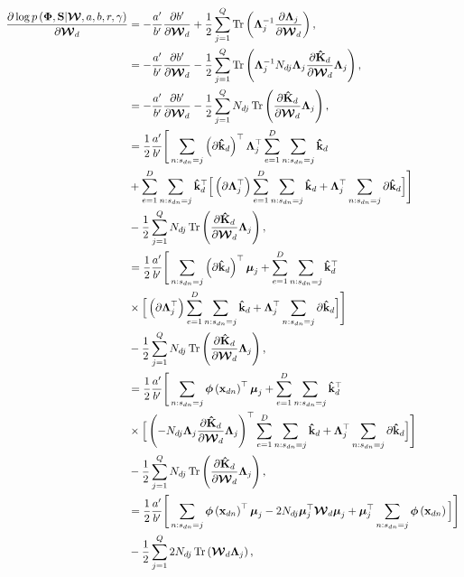 \documentclass[]{article}
\newcommand{\dWj}{\partial\projMat}
\newcommand{\C}{\boldsymbol{\Lambda}_j}
\newcommand{\muJ}{\boldsymbol{\mu}_j}
\newcommand{\W}{\boldsymbol{\mathcal{W}}}
\newcommand{\indobj}{\mathbf{x}_{dn}}
\newcommand{\projMat}{\boldsymbol{\mathcal{W}}_d}
\newcommand{\phixnd}{\boldsymbol{\phi}\left(\indobj\right)}
\newcommand{\kawx}{\mathbf{\hat{k}}_d }
\begin{document}
\begin{align}
\frac{\partial \log p\left(\boldsymbol{\Phi},\mathbf{S}|\W,a,b,r,\gamma\right)}{\partial\projMat} &=
  -\frac{a'}{b'}\frac{\partial b'}{\dWj}+\frac{1}{2}\sum_{j=1}^{Q} \operatorname{Tr}\left(\C^{-1}\frac{\partial \C}{\dWj}\right),\notag\\
& =  -\frac{a'}{b'}\frac{\partial b'}{\dWj}-\frac{1}{2}\sum_{j=1}^{Q} \operatorname{Tr}\left(\C^{-1}N_{dj}\C\frac{ \partial \mathbf{\hat{K}}_d}{\dWj} \C\right),\notag \\
& =  -\frac{a'}{b'}\frac{\partial b'}{\dWj}-\frac{1}{2}\sum_{j=1}^{Q}N_{dj} \operatorname{Tr}\left(\frac{ \partial \mathbf{\hat{K}}_d}{\dWj} \C\right),\notag \\
& =  \frac{1}{2}\frac{a'}{b'}  \Bigg[\sum\limits_{n:s_{dn}=j}  \left(\partial \kawx\right)^\top\C^\top  \sum\limits_{e=1}^{D}\sum\limits_{n:s_{dn}=j}\kawx\notag\\
&  + \sum\limits_{e=1}^{D}\sum\limits_{n:s_{dn}=j}\kawx^\top \Big[\left(\partial \C^\top\right) \sum\limits_{e=1}^{D}\sum\limits_{n:s_{dn}=j} \kawx +\C^\top \sum\limits_{n:s_{dn}=j} \partial\kawx\Big]
\Bigg] \notag\\
& -\frac{1}{2}\sum_{j=1}^{Q}N_{dj} \operatorname{Tr}\left(\frac{ \partial \mathbf{\hat{K}}_d}{\dWj} \C\right), \\
& =  \frac{1}{2}\frac{a'}{b'}  \Bigg[\sum\limits_{n:s_{dn}=j}  \left(\partial \kawx\right)^\top\muJ  + \sum\limits_{e=1}^{D}\sum\limits_{n:s_{dn}=j}\kawx^\top \notag\\
& \times\Big[\left(\partial \C^\top\right) \sum\limits_{e=1}^{D}\sum\limits_{n:s_{dn}=j} \kawx +\C^\top \sum\limits_{n:s_{dn}=j} \partial\kawx\Big]
\Bigg] \notag\\
& -\frac{1}{2}\sum_{j=1}^{Q}N_{dj} \operatorname{Tr}\left(\frac{ \partial \mathbf{\hat{K}}_d}{\dWj} \C\right), \notag \\
& =  \frac{1}{2}\frac{a'}{b'}  \Bigg[\sum\limits_{n:s_{dn}=j}  \phixnd^\top\muJ  + \sum\limits_{e=1}^{D}\sum\limits_{n:s_{dn}=j}\kawx^\top \notag\\
& \times\Big[\left(-N_{dj}\C\frac{ \partial \mathbf{\hat{K}}_d}{\dWj} \C\right)^\top \sum\limits_{e=1}^{D}\sum\limits_{n:s_{dn}=j} \kawx +\C^\top \sum\limits_{n:s_{dn}=j} \partial\kawx\Big]
\Bigg] \notag\\
& -\frac{1}{2}\sum_{j=1}^{Q}N_{dj} \operatorname{Tr}\left(\frac{ \partial \mathbf{\hat{K}}_d}{\dWj} \C\right), \notag \\
& =  \frac{1}{2}\frac{a'}{b'}  \Bigg[\sum\limits_{n:s_{dn}=j}  \phixnd^\top\muJ  - 2N_{dj}\muJ^\top\projMat\muJ
 +\muJ^\top \sum\limits_{n:s_{dn}=j} \phixnd\Big]
\Bigg] \notag\\
& -\frac{1}{2}\sum_{j=1}^{Q}2N_{dj} \operatorname{Tr}\left(\projMat \C\right),
\end{align}
\end{document}
